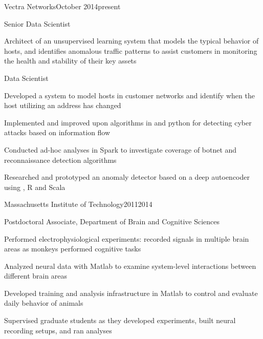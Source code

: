 \documentclass{report}
\begin{document}

  \begin{work_location}{Vectra Networks}{October 2014}{present}

    \begin{position}{Senior Data Scientist}
      \item Architect of an unsupervised learning system that models the typical behavior of hosts, and identifies anomalous traffic patterns to assist customers in monitoring the health and stability of their key assets
    \end{position}

    \begin{position}{Data Scientist}
      \item Developed a system to model hosts in customer networks and identify when the host utilizing an address has changed
      \item Implemented and improved upon algorithms in \CC{} and python for detecting cyber attacks based on information flow
      \item Conducted ad-hoc analyses in Spark to investigate coverage of botnet and reconnaissance detection algorithms
      \item Researched and prototyped an anomaly detector based on a deep autoencoder using \HzO{}, R and Scala
    \end{position}

  \end{work_location}



  \begin{work_location}{Massachusetts Institute of Technology}{2011}{2014}

    \begin{position}{Postdoctoral Associate, Department of Brain and Cognitive Sciences}
      \item {} Performed electrophysiological experiments: recorded signals in multiple brain areas as monkeys performed cognitive tasks
      \item Analyzed neural data with Matlab to examine system-level interactions between different brain areas
      \item Developed training and analysis infrastructure in Matlab to control and evaluate daily behavior of animals
      \item Supervised graduate students as they developed experiments, built neural recording setups, and ran analyses
    \end{position}

  \end{work_location}
\end{document}
